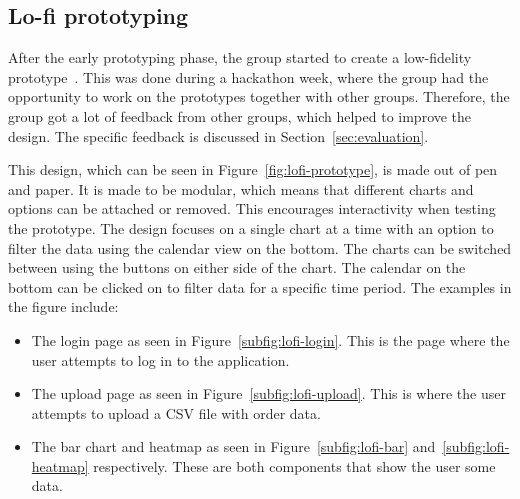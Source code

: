 \subsection{Lo-fi prototyping}\label{subsec:lo-fi-prototyping}

After the early prototyping phase, the group started to create a low-fidelity prototype~\cite{hi-lo-fidelity}.
This was done during a hackathon week, where the group had the opportunity to work on the prototypes together with
other groups.
Therefore, the group got a lot of feedback from other groups, which helped to improve the design.
The specific feedback is discussed in Section~\ref{sec:evaluation}.

This design, which can be seen in Figure~\ref{fig:lofi-prototype}, is made out of pen and paper.
It is made to be modular, which means that different charts and options can be attached or removed.
This encourages interactivity when testing the prototype.
The design focuses on a single chart at a time with an option to filter
the data using the calendar view on the bottom.
The charts can be switched between using the buttons on either side of the chart.
The calendar on the bottom can be clicked on to filter data for a specific time period.
The examples in the figure include:

\begin{itemize}
    \item The login page as seen in Figure~\ref{subfig:lofi-login}.
    This is the page where the user attempts to log in to the application.
    \item The upload page as seen in Figure~\ref{subfig:lofi-upload}.
    This is where the user attempts to upload a CSV file with order data.
    \item The bar chart and heatmap as seen in Figure~\ref{subfig:lofi-bar} and~\ref{subfig:lofi-heatmap} respectively.
    These are both components that show the user some data.
\end{itemize}

